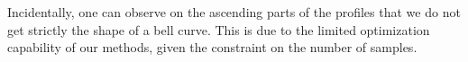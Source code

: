 \documentclass[10pt]{article}
\newcommand\xcsf{\textsc{xcsf}\xspace}
\newcommand\ceps{\textsc{ceps}\xspace}
\begin{document}
Incidentally, one can observe on the ascending parts of the profiles that we do not get
strictly the shape of a bell curve. This is due to the limited optimization capability
of our methods, given the constraint on the number of samples.









\end{document}
